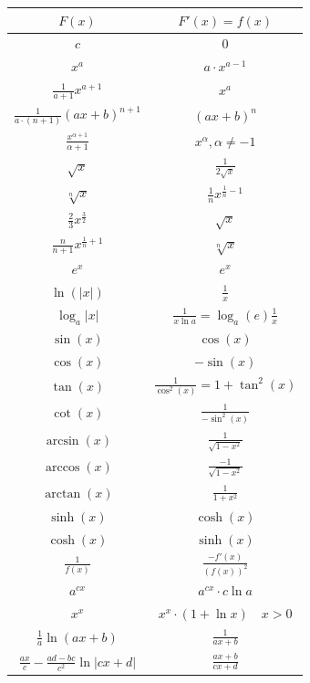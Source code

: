 \begin{center}
    \begin{tabular}{c||c}
        $F(x)$ & $F'(x) = f(x)$ \\
        \hline \hline
            
        $ c $ & $ 0 $ \\
	    $ x^a $ & $ a \cdot x^{a - 1} $ \\
        $ \frac{1}{a+1} x^{a+1} $ & $ x^a $ \\
        $ \frac{1}{a\cdot(n+1)} (ax+b)^{n+1} $ & $ (ax+b)^n $ \\
	    $ \frac{x^{\alpha+1}}{\alpha + 1} $ & $ x^\alpha, \alpha \neq -1 $ \\
        $ \sqrt x $ & $ \frac{1}{2 \sqrt x} $ \\
        $ \sqrt[n] x $ & $ \frac{1}{n} {x}^{ \frac{1}{n} -1 } $ \\
        $ \frac{2}{3} x^{ \frac{3}{2} } $ & $ \sqrt x $ \\
        $ \frac{n}{n+1} x^{ \frac{1}{n}+1 } $ & $ \sqrt[n] x $ \\
	    $ e^x $ & $ e^x $ \\
	    $ \ln(|x|) $ & $ \frac{1}{x} $ \\
        $ \log_a |x| $  &  $ \frac{1}{x \ln a} = \log_a(e) \frac{1}{x} $ \\
	    $ \sin(x) $ & $ \cos(x) $ \\
	    $ \cos(x) $ & $ -\sin(x) $ \\
	    $ \tan(x) $ & $ \frac{1}{\cos^2(x)} = 1 + \tan^2(x) $ \\
	    $ \cot(x) $ & $ \frac{1}{-\sin^2(x)} $ \\
	    $ \arcsin(x) $ & $ \frac{1}{\sqrt{1 - x^2}} $ \\
	    $ \arccos(x) $ & $ \frac{-1}{\sqrt{1 - x^2}} $ \\
	    $ \arctan(x) $ & $ \frac{1}{1 + x^2} $ \\
	    $ \sinh(x) $ & $ \cosh(x) $ \\
	    $ \cosh(x) $ & $ \sinh(x) $ \\
        $ \frac{1}{f(x)} $ & $ \frac{-f'(x)}{(f(x))^2} $ \\
        $ a^{cx} $ & $ a^{cx} \cdot c \ln a $ \\
        $ x^x $ & $ x^x \cdot (1+\ln x) \quad \scriptstyle x > 0 $ \\
        $ \frac{1}{a} \ln (ax+b) $  &  $ \frac{1}{ax+b}$ \\
        $ \frac{ax}{c}-\frac{ad-bc}{c^2} \ln |cx+d| $  &  $ \frac{ax+b}{cx+d} $ \\

\end{tabular}
\end{center}
